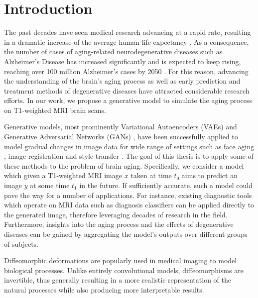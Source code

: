 \chapter{Introduction}




The past decades have seen medical research advancing at a rapid rate, resulting in a dramatic increase of the average human life expectancy \cite{owidlifeexpectancy}. As a consequence, the number of cases of aging-related neurodegenerative diseases such as Alzheimer's Disease has increased significantly and is expected to keep rising, reaching over 100 million Alzheimer's cases by 2050 \cite{brookmeyer2007forecasting}. For this reason, advancing the understanding of the brain's aging process as well as early prediction and treatment methods of degenerative diseases have attracted considerable research efforts. In our work, we propose a generative model to simulate the aging process on T1-weighted MRI brain scans.%

Generative models, most prominently Variational Autoencoders (VAEs) \cite{kingma2013auto} and Generative Adversarial Networks (GANs) \cite{goodfellow2014generative}, have been successfully applied to model gradual changes in image data for wide range of settings such as face aging \cite{palsson2018generative}, image registration \cite{balakrishnan2019voxelmorph} and style transfer \cite{zhu2017unpaired}. The goal of this thesis is to apply some of these methods to the problem of brain aging. Specifically, we consider a model which given a T1-weighted MRI image $x$ taken at time $t_0$ aims to predict an image $y$ at some time $t_1$ in the future. If sufficiently accurate, such a model could pave the way for a number of applications. For instance, existing diagnostic tools which operate on MRI data such as diagnosis classifiers can be applied directly to the generated image, therefore leveraging decades of research in the field. Furthermore, insights into the aging process and the effects of degenerative diseases can be gained by aggregating the model's outputs over different groups of subjects.

Diffeomorphic deformations are popularly used in medical imaging to model biological processes. Unlike entirely convolutional models, diffeomorphisms are invertible, thus generally resulting in a more realistic representation of the natural processes while also producing more interpretable results.


